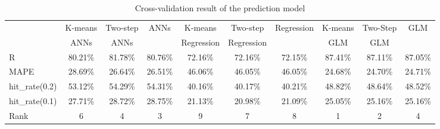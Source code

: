 \begin{table}[hbtp]
  \begin{center}
    \caption{Cross-validation result of the prediction model}
    \label{tab:is_result}
    \scriptsize
    \begin{tabular}{l c c c c c c c c c}
      \hline
       & K-means & Two-step & ANNs & K-means    & Two-step   & Regression & K-means & Two-Step & GLM \\
       &   ANNs  &   ANNs   &      & Regression & Regression &            &   GLM   &   GLM    & \\ 
      \hline
   	   R              & 80.21\% & 81.78\% & 80.76\% & 72.16\% & 72.16\% & 72.15\% & 87.41\% & 87.11\% & 87.05\% \\
       MAPE           & 28.69\% & 26.64\% & 26.51\% & 46.06\% & 46.05\% & 46.05\% & 24.68\% & 24.70\% & 24.71\% \\
       hit\_rate(0.2) & 53.12\% & 54.29\% & 54.31\% & 40.16\% & 40.17\% & 40.21\% & 48.82\% & 48.64\% & 48.52\% \\
       hit\_rate(0.1) & 27.71\% & 28.72\% & 28.75\% & 21.13\% & 20.98\% & 21.09\% & 25.05\% & 25.16\% & 25.16\% \\
      \hline
       Rank & 6 & 4 & 3 & 9 & 7 & 8 & 1 & 2 & 4 \\
      \hline
      \end{tabular}
  \end{center}
\end{table}

